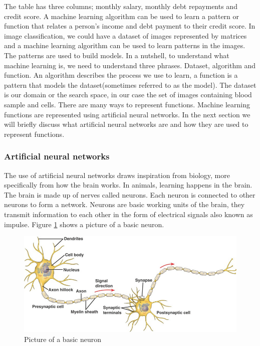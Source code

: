 \documentclass[a4paper,11pt]{article}
\begin{document}
The table has three columns; monthly salary, monthly debt repayments and credit score. A machine learning algorithm can be used to learn a pattern or function that relates a person's income and debt payment to their credit score. In image classification, we could have a dataset of images represented by matrices and a machine learning algorithm can be used to learn patterns in the images. The patterns are used to build models.  In a nutshell, to understand what machine learning is, we need to understand three phrases. Dataset, algorithm and function. An algorithm describes the process we use to learn, a function is a pattern that models the dataset(sometimes referred to as the model). The dataset is our domain or the search space, in our case the set of images containing blood sample and cells. There are many ways to represent functions.  Machine learning functions are represented using artificial neural networks.  In the next section we will briefly discuss what artificial neural networks are and how they are used to represent functions.

\subsubsection{Artificial neural networks}
\label{section: ANN}
The use of artificial neural networks draws inspiration from biology, more specifically from how the brain works. In animals, learning happens in the brain. The brain is made up of nerves called neurons. Each neuron is connected to other neurons to form a network. Neurons are basic working units of the brain, they transmit information to each other in the form of electrical signals also known as impulse. Figure \ref{fig: neuron} shows a picture of a basic neuron.

 \begin{figure}[!htbp]
  \includegraphics[scale=0.5]{neuron-structure.png} 
  \caption{Picture of a basic neuron \citep{Grau}}
  \label{fig: neuron}
 \end{figure}
\end{document}
